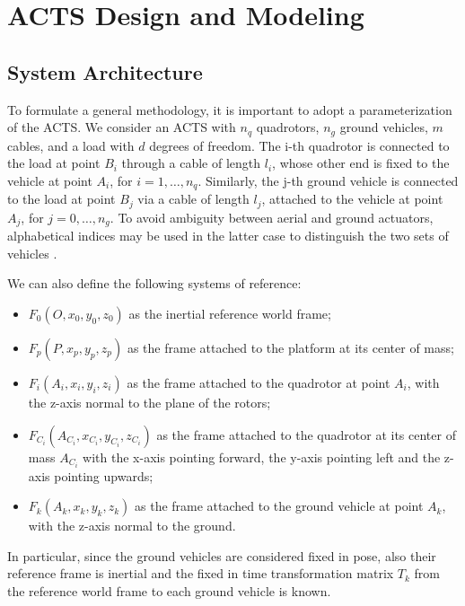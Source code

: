 
\chapter{ACTS Design and Modeling}
\label{chap:design_modeling}
\section{System Architecture}
To formulate a general methodology, it is important to adopt a parameterization of the ACTS. We consider an ACTS with $n_q$ quadrotors, $n_g$ ground vehicles, $m$ cables, and a load with $d$ degrees of freedom.
The i-th quadrotor is connected to the load at point $B_i$ through a cable of length $l_i$, 
whose other end is fixed to the vehicle at point $A_i$, for $i = 1, \dots, n_q$. Similarly, the j-th ground vehicle is connected to the load at point $B_j$ via a cable of length $l_j$, attached to the vehicle at point $A_j$, for $j = 0, \dots, n_g$. To avoid ambiguity between aerial and ground actuators, alphabetical indices may be used in the latter case to distinguish the two sets of vehicles \cite{erskine_wrench_2019}.

\noindent We can also define the following systems of reference:
\begin{itemize}
    \item $F_0(O, x_0, y_0, z_0)$ as the inertial reference world frame;
    \item $F_p(P, x_p, y_p, z_p)$ as the frame attached to the platform at its center of mass;
    \item $F_i(A_i, x_i, y_i, z_i)$ as the frame attached to the quadrotor at point $A_i$, with the z-axis normal to the plane of the rotors;
    \item $F_{C_i}(A_{C_i}, x_{C_i}, y_{C_i}, z_{C_i})$ as the frame attached to the quadrotor at its center of mass $A_{C_i}$ with the x-axis pointing forward, the y-axis pointing left and the z-axis pointing upwards;
    \item $F_k(A_k, x_k, y_k, z_k)$ as the frame attached to the ground vehicle at point $A_k$, with the z-axis normal to the ground.
\end{itemize}
In particular, since the ground vehicles are considered fixed in pose, also their reference frame is inertial and the fixed in time transformation matrix $T_k$ from the reference world frame to each ground vehicle is known.

